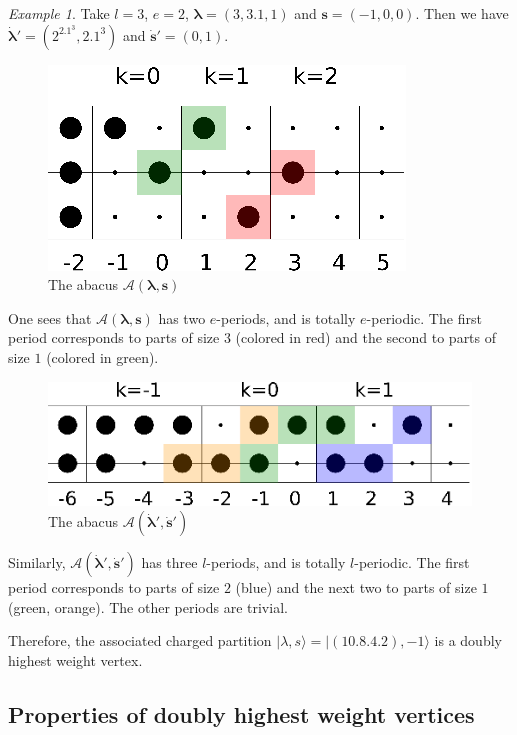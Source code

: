 \documentclass[twoside,12pt]{amsart}
\theoremstyle{plain}
\newcommand{\cA}{\mathcal{A}}
\newcommand{\bs}{\mathbf{s}}
\newcommand{\la}{\lambda}
\newcommand{\bla}{\boldsymbol{\la}}
\newcommand{\dbs}{\dot{\bs}}
\newcommand{\dbla}{\dot{\bla}}
\theoremstyle{remark}
\newtheorem{exa}[num]{Example}
\begin{document}
\begin{exa} \label{exa_doubly_hw}
Take $l=3$, $e=2$, $\bla = (3,3.1,1)$ and $\bs=(-1,0,0)$.
Then we have $\dbla' = (2^2.1^3,2.1^3)$ and $\dbs' = (0,1)$.
\begin{figure}[H] 
\includegraphics{images/abaque9.eps}
\caption{The abacus $\cA(\bla,\bs)$}
\label{ab9}
\end{figure}
One sees that $\cA(\bla,\bs)$ has two $e$-periods, and is totally $e$-periodic.
The first period corresponds to parts of size $3$ (colored in red)
and the second to parts of size $1$ (colored in green).

\begin{figure}[H] 
\includegraphics{images/abaque10.eps}
\caption{The abacus $\cA(\dbla',\dbs')$}
\label{ab10}
\end{figure}
Similarly, $\cA(\dbla',\dbs')$ has three $l$-periods, and is totally $l$-periodic.
The first period corresponds to parts of size $2$ (blue) and the next two to parts of size $1$ (green, orange).
The other periods are trivial.

Therefore, the associated charged partition $|\la,s\rangle = |(10.8.4.2),-1\rangle$
is a doubly highest weight vertex.
\end{exa}




\subsection{Properties of doubly highest weight vertices}\label{doubly_hw_properties}\
\end{document}
